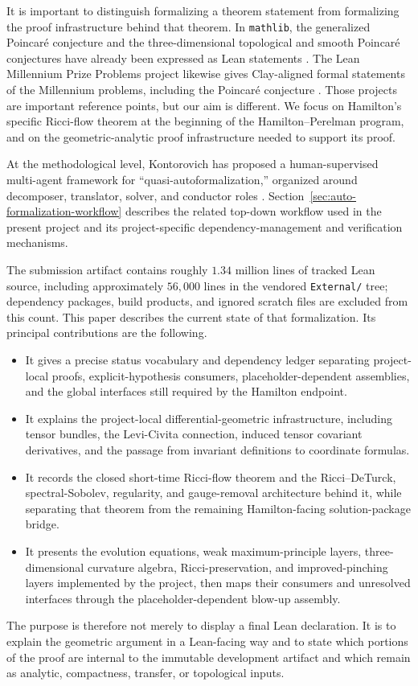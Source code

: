 \documentclass[11pt]{article}
\theoremstyle{plain}
\theoremstyle{definition}
\theoremstyle{remark}
\begin{document}
It is important to distinguish formalizing a theorem statement from formalizing
the proof infrastructure behind that theorem.  In \texttt{mathlib}, the
generalized Poincar\'e conjecture and the three-dimensional topological and
smooth Poincar\'e conjectures have already been expressed as Lean statements
\cite{XuPoincareMathlib}.  The Lean Millennium Prize Problems project likewise
gives Clay-aligned formal statements of the Millennium problems, including the
Poincar\'e conjecture \cite{LeanMillenniumPrizeProblems}.  Those projects are
important reference points, but our aim is different.  We focus on Hamilton's
specific Ricci-flow theorem at the beginning of the Hamilton--Perelman program,
and on the geometric-analytic proof infrastructure needed to support its proof.

At the methodological level, Kontorovich has proposed a human-supervised
multi-agent framework for ``quasi-autoformalization,'' organized around
decomposer, translator, solver, and conductor roles
\cite{KontorovichShape}.  Section~\ref{sec:auto-formalization-workflow}
describes the related top-down workflow used in the present project and its
project-specific dependency-management and verification mechanisms.

The submission artifact contains roughly $1.34$ million lines of tracked
Lean source, including approximately $56{,}000$ lines in the vendored
\texttt{External/} tree; dependency packages, build products, and ignored
scratch files are excluded from this count.  This paper describes the current
state of that formalization.  Its principal
contributions are the following.
\begin{itemize}[leftmargin=2em]
  \item It gives a precise status vocabulary and dependency ledger separating
  project-local proofs, explicit-hypothesis consumers,
  placeholder-dependent assemblies, and the global interfaces still required
  by the Hamilton endpoint.
  \item It explains the project-local differential-geometric infrastructure,
  including tensor bundles, the Levi-Civita connection, induced tensor
  covariant derivatives, and the passage from invariant definitions to
  coordinate formulas.
  \item It records the closed short-time Ricci-flow theorem and the
    Ricci--DeTurck, spectral-Sobolev,
    regularity, and
    gauge-removal architecture behind it, while separating that theorem from
    the remaining Hamilton-facing solution-package bridge.
  \item It presents the evolution equations, weak maximum-principle layers,
  three-dimensional curvature algebra, Ricci-preservation, and
  improved-pinching layers implemented by the project, then maps their consumers
  and unresolved interfaces through the placeholder-dependent blow-up
  assembly.
\end{itemize}
The purpose is therefore not merely to display a final Lean declaration.  It
is to explain the geometric argument in a Lean-facing way and to state which
portions of the proof are internal to the immutable development artifact and
which remain as analytic, compactness, transfer, or topological inputs.
\end{document}
